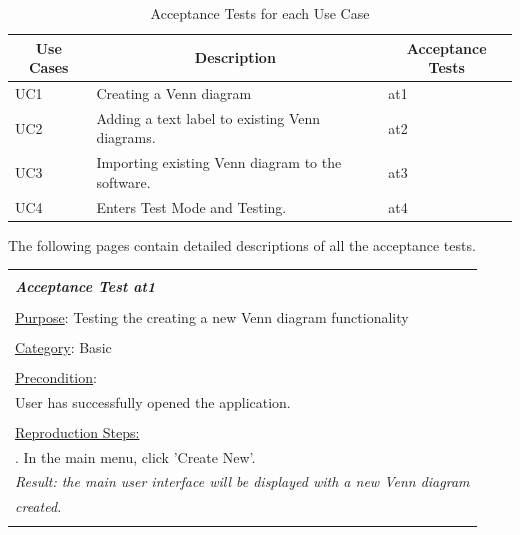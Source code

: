 \documentclass[fontsize=12pt,paper=letter,twoside]{scrartcl}
\begin{document}
\begin{table}[!ht]
	\centering
	\begin{tabular}{|l|l|l|}
		\hline
		\multicolumn{1}{|c|}{\textbf{Use Cases}} & \multicolumn{1}{c|}{\textbf{Description}}                                    & \multicolumn{1}{c|}{\textbf{Acceptance Tests}} \\ \hline
		UC1                                      & Creating a Venn diagram                  & at1                                            \\ \hline
		UC2                                      & Adding a text label to existing Venn diagrams.                        			     & at2                                            \\ \hline
		UC3                                      & Importing existing Venn diagram to the software.                        			     & at3                                            \\ \hline
		UC4                                      & Enters Test Mode and Testing.                        			     & at4                                            \\ \hline
	\end{tabular}
	\caption{Acceptance Tests for each Use Case}
	\label{acceptance-tests}
\end{table}

The following pages contain detailed descriptions of all the acceptance tests.

\newpage

\begin{table}[!h]
	\begin{tabular}{|l|}
		\hline
		\\
		\textbf{\emph{Acceptance Test at1}} 	
		\\\\
		\underline{Purpose}: Testing the creating a new Venn diagram functionality						\\
		\\
		\underline{Category}: Basic															\\
		\\
		\underline{Precondition}:															\\ \qquad
		User has successfully opened the application.										\\
		\\
		\underline{Reproduction Steps:}
		\\ \qquad 1. In the main menu, click 'Create New'.
		\\ \qquad \textit{Result: the main user interface will be displayed with a new Venn diagram}
		\\ \qquad \qquad \qquad \textit{created.}
		\\\\
		\hline
	\end{tabular}
\end{table}
\end{document}
